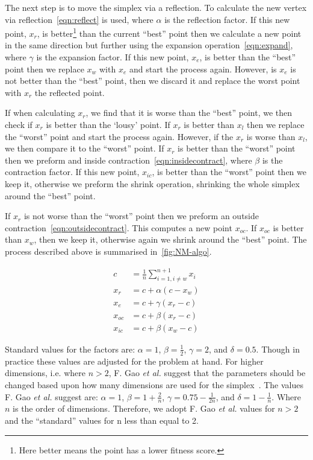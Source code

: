 The next step is to move the simplex via a reflection.
To calculate the new vertex via reflection~\cref{eqn:reflect} is used, where $\alpha$ is the reflection factor.
If this new point, $x_r$, is better\footnote{Here better means the point has a lower fitness score.} than the current ``best'' point then we calculate a new point in the same direction but further using the expansion operation~\cref{eqn:expand}, where $\gamma$ is the expansion factor.
If this new point, $x_e$, is better than the ``best'' point then we replace $x_w$ with $x_e$ and start the process again.
However, is $x_e$ is not better than the ``best'' point, then we discard it and replace the worst point with $x_r$ the reflected point.

If when calculating $x_r$, we find that it is worse than the ``best'' point, we then check if $x_r$ is better than the `lousy' point.
If $x_r$ is better than $x_l$ then we replace the ``worst'' point and start the process again.
However, if the $x_r$ is worse than $x_l$, we then compare it to the ``worst'' point.
If $x_r$ is better than the ``worst'' point then we preform and inside contraction~\cref{eqn:insidecontract}, where $\beta$ is the contraction factor.
If this new point, $x_{ic}$, is better than the ``worst'' point then we keep it, otherwise we preform the shrink operation, shrinking the whole simplex around the ``best'' point.

If $x_r$ is not worse than the ``worst'' point then we preform an outside contraction~\cref{eqn:outsidecontract}.
This computes a new point $x_{oc}$.
If $x_{oc}$ is better than $x_w$, then we keep it, otherwise again we shrink around the ``best'' point.
The process described above is summarised in~\cref{fig:NM-algo}.

\begin{align}
c &= \frac{1}{n}\sum \limits_{i=1,i\neq w}^{n+1} x_i \label{eqn:centroid}\\
x_r &= c + \alpha(c - x_w)\label{eqn:reflect}\\
x_e &= c + \gamma(x_r - c)\label{eqn:expand}\\
x_{oc} &= c + \beta(x_r - c)\label{eqn:outsidecontract}\\
x_{ic} &= c + \beta(x_w - c)\label{eqn:insidecontract}
\end{align}

Standard values for the factors are: $\alpha=1$, $\beta=\frac{1}{2}$, $\gamma=2$, and $\delta=0.5$.
Though in practice these values are adjusted for the problem at hand.
For higher dimensions, i.e. where $n > 2$, F. Gao \textit{et al.} suggest that the parameters should be changed based upon how many dimensions are used for the simplex~\cite{gao2012implementing}.
The values F. Gao \textit{et al.} suggest are: $\alpha=1$, $\beta=1+\tfrac{2}{n}$, $\gamma=0.75-\tfrac{1}{2n}$, and $\delta=1-\tfrac{1}{n}$.
Where $n$ is the order of dimensions.
Therefore, we adopt F. Gao \textit{et al.} values for $n>2$ and the ``standard'' values for n less than equal to 2.

